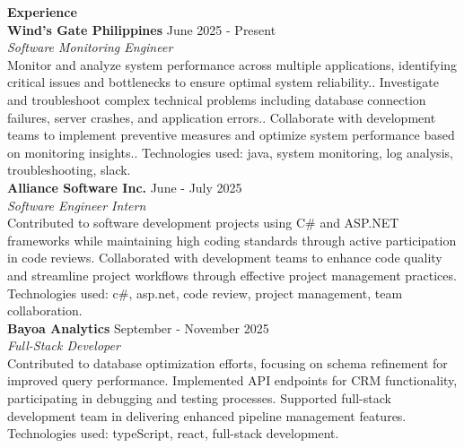 \documentclass[11pt,letterpaper]{article}
\newcommand{\ressection}[1]{\vspace{0.3cm}\textbf{\large #1}\\[0.1cm]}
\begin{document}
\ressection{Experience}
\textbf{Wind's Gate Philippines} \hfill June 2025 - Present\\\textit{Software Monitoring Engineer}\\Monitor and analyze system performance across multiple applications, identifying critical issues and bottlenecks to ensure optimal system reliability.. Investigate and troubleshoot complex technical problems including database connection failures, server crashes, and application errors.. Collaborate with development teams to implement preventive measures and optimize system performance based on monitoring insights.. Technologies used: java, system monitoring, log analysis, troubleshooting, slack.\\[0.3cm]\textbf{Alliance Software Inc.} \hfill June - July 2025\\\textit{Software Engineer Intern}\\Contributed to software development projects using C\# and ASP.NET frameworks while maintaining high coding standards through active participation in code reviews. Collaborated with development teams to enhance code quality and streamline project workflows through effective project management practices. Technologies used: c\#, asp.net, code review, project management, team collaboration.\\[0.3cm]\textbf{Bayoa Analytics} \hfill September - November 2025\\\textit{Full-Stack Developer}\\Contributed to database optimization efforts, focusing on schema refinement for improved query performance. Implemented API endpoints for CRM functionality, participating in debugging and testing processes. Supported full-stack development team in delivering enhanced pipeline management features. Technologies used: typeScript, react, full-stack development.\\[0.3cm]
\end{document}
